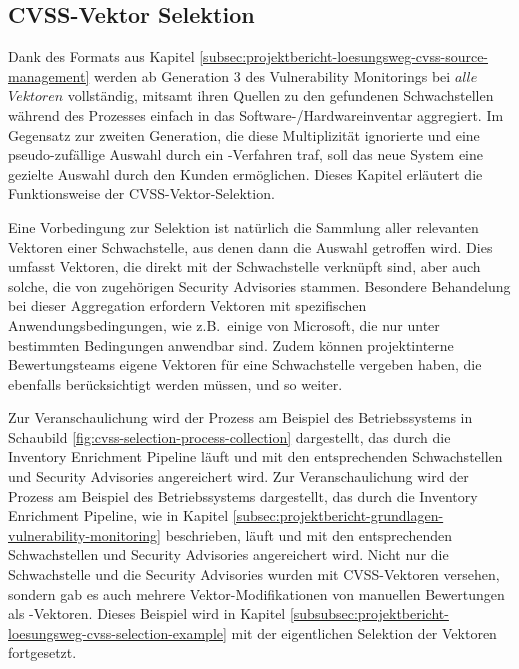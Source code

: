 \subsection{CVSS-Vektor Selektion} \label{subsec:projektbericht-loesungsweg-cvss-selection}

Dank des Formats aus Kapitel \ref{subsec:projektbericht-loesungsweg-cvss-source-management} werden ab Generation 3 des Vulnerability Monitorings bei {\metaeffekt} $alle$ $Vektoren$ vollständig, mitsamt ihren Quellen zu den gefundenen Schwachstellen während des Prozesses einfach in das Software-/Hardwareinventar aggregiert.
Im Gegensatz zur zweiten Generation, die diese Multiplizität ignorierte und eine pseudo-zufällige Auswahl durch ein -Verfahren traf, soll das neue System eine gezielte Auswahl durch den Kunden ermöglichen.
Dieses Kapitel erläutert die Funktionsweise der CVSS-Vektor-Selektion.

Eine Vorbedingung zur Selektion ist natürlich die Sammlung aller relevanten Vektoren einer Schwachstelle, aus denen dann die Auswahl getroffen wird.
Dies umfasst Vektoren, die direkt mit der Schwachstelle verknüpft sind, aber auch solche, die von zugehörigen Security Advisories stammen.
Besondere Behandelung bei dieser Aggregation erfordern Vektoren mit spezifischen Anwendungsbedingungen, wie z.B.\ einige von Microsoft, die nur unter bestimmten Bedingungen anwendbar sind.
Zudem können projektinterne Bewertungsteams eigene Vektoren für eine Schwachstelle vergeben haben, die ebenfalls berücksichtigt werden müssen, und so weiter.

\ifshortenedReport
Zur Veranschaulichung wird der Prozess am Beispiel des Betriebssystems  in Schaubild \ref{fig:cvss-selection-process-collection} dargestellt, das durch die Inventory Enrichment Pipeline läuft und mit den entsprechenden Schwachstellen und Security Advisories angereichert wird.
\else
Zur Veranschaulichung wird der Prozess am Beispiel des Betriebssystems  dargestellt, das durch die Inventory Enrichment Pipeline, wie in Kapitel \ref{subsec:projektbericht-grundlagen-vulnerability-monitoring} beschrieben, läuft und mit den entsprechenden Schwachstellen und Security Advisories angereichert wird.
\fi
Nicht nur die Schwachstelle und die Security Advisories wurden mit CVSS-Vektoren versehen, sondern gab es auch mehrere Vektor-Modifikationen von manuellen Bewertungen als -Vektoren.
Dieses Beispiel wird in Kapitel \ref{subsubsec:projektbericht-loesungsweg-cvss-selection-example} mit der eigentlichen Selektion der Vektoren fortgesetzt.

